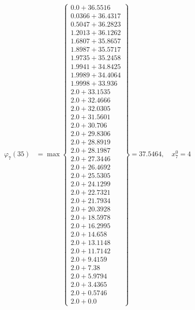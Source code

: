 \documentclass{article}
\begin{document}
\begin{align*}
\varphi_{7}(35) &= \max \left\{ \begin{array}{c}
0.0 + 36.5516 \\
 0.0366 + 36.4317 \\
 0.5047 + 36.2823 \\
 1.2013 + 36.1262 \\
 1.6807 + 35.8657 \\
 1.8987 + 35.5717 \\
 1.9735 + 35.2458 \\
 1.9941 + 34.8425 \\
 1.9989 + 34.4064 \\
 1.9998 + 33.936 \\
 2.0 + 33.1535 \\
 2.0 + 32.4666 \\
 2.0 + 32.0305 \\
 2.0 + 31.5601 \\
 2.0 + 30.706 \\
 2.0 + 29.8306 \\
 2.0 + 28.8919 \\
 2.0 + 28.1987 \\
 2.0 + 27.3446 \\
 2.0 + 26.4692 \\
 2.0 + 25.5305 \\
 2.0 + 24.1299 \\
 2.0 + 22.7321 \\
 2.0 + 21.7934 \\
 2.0 + 20.3928 \\
 2.0 + 18.5978 \\
 2.0 + 16.2995 \\
 2.0 + 14.658 \\
 2.0 + 13.1148 \\
 2.0 + 11.7142 \\
 2.0 + 9.4159 \\
 2.0 + 7.38 \\
 2.0 + 5.9794 \\
 2.0 + 3.4365 \\
 2.0 + 0.5746 \\
 2.0 + 0.0
\end{array} \right\}=37.5464, \quad x_{7}^0=4\\
  

\end{align*}
\end{document}
